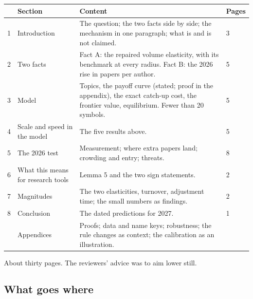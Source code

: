 \begin{center}\small
\begin{tabularx}{\textwidth}{@{}P{0.25in}P{1.9in}LP{0.5in}@{}}
\toprule
 & Section & Content & Pages \\
 & Introduction & The question; the two facts side by side; the mechanism in one paragraph; what is and is not claimed. & 3 \\
2 & Two facts & Fact A: the repaired volume elasticity, with its benchmark at every radius. Fact B: the 2026 rise in papers per author. & 5 \\
3 & Model & Topics, the payoff curve (stated; proof in the appendix), the exact catch-up cost, the frontier value, equilibrium. Fewer than 20 symbols. & 5 \\
4 & Scale and speed in the model & The five results above. & 5 \\
5 & The 2026 test & Measurement; where extra papers land; crowding and entry; threats. & 8 \\
6 & What this means for research tools & Lemma 5 and the two sign statements. & 2 \\
7 & Magnitudes & The two elasticities, turnover, adjustment time; the small numbers as findings. & 2 \\
8 & Conclusion & The dated predictions for 2027. & 1 \\
\midrule
 & Appendices & Proofs; data and name keys; robustness; the rule changes as context; the calibration as an illustration. & \\
\bottomrule
\end{tabularx}
\end{center}

About thirty pages. The reviewers' advice was to aim lower still.

\subsection{What goes where}

